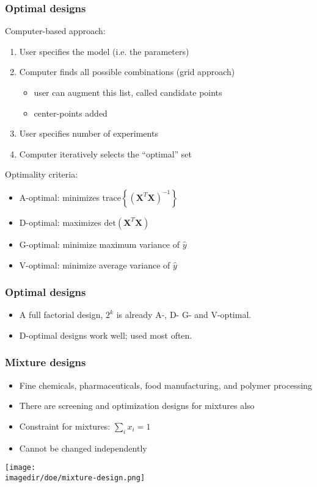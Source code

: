 \begin{frame}\frametitle{Optimal designs}

	Computer-based approach:
	\begin{enumerate}
		\item	User specifies the model (i.e. the parameters)
		\item	Computer finds all possible combinations (grid approach)
		\begin{itemize}
			\item	user can augment this list, called candidate points
			\item	center-points added
		\end{itemize}
		\item	User specifies number of experiments
		\item	Computer iteratively selects the ``optimal'' set
	\end{enumerate}

	Optimality criteria:
	\begin{itemize}
		\item	A-optimal: minimizes $\text{trace}\left\{(\mathbf{X}^T\mathbf{X})^{-1}\right\}$
		\item	D-optimal: maximizes $\text{det}(\mathbf{X}^T\mathbf{X})$
		\item	G-optimal: minimize maximum variance of $\hat{y}$
		\item	V-optimal: minimize average variance of $\hat{y}$
	\end{itemize}
\end{frame}

\begin{frame}\frametitle{Optimal designs}
	\begin{itemize}
		\item	A full factorial design, $2^k$ is already A-, D- G- and V-optimal.
		\item	D-optimal designs work well; used most often.
	\end{itemize}
\end{frame}

\begin{frame}\frametitle{Mixture designs}
	\begin{itemize}
		\item	Fine chemicals, pharmaceuticals, food manufacturing, and polymer processing
		\item	There are screening and optimization designs for mixtures also
		\item	Constraint for mixtures: $\sum_i x_i = 1$
		\item	Cannot be changed independently
	\end{itemize}
	\begin{center}
		\texttt{[image: \\imagedir/doe/mixture-design.png]}
	\end{center}
\end{frame}
